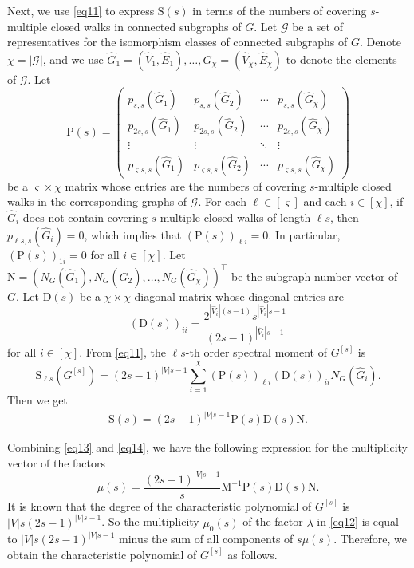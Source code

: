 \documentclass{article}
\begin{document}
Next, 
we use \eqref{eq11} to express $\mathrm{S}(s)$ in terms of the numbers of covering $s$-multiple closed walks in connected subgraphs of $G$.
Let $\mathcal{G}$ be a set of representatives for the isomorphism classes of connected subgraphs of $G$.
Denote $\chi=|\mathcal{G}|$,
and we use $\widehat{G}_{1}=(\widehat{V}_{1},\widehat{E}_{1}), \ldots , \widehat{G}_{\chi}=(\widehat{V}_{\chi},\widehat{E}_{\chi})$ to denote the elements of $\mathcal{G}$.
Let $$\mathrm{P}(s)=\begin{pmatrix} p_{s,s}(\widehat{G}_{1}) & p_{s,s}(\widehat{G}_{2}) & \cdots & p_{s,s}(\widehat{G}_{\chi}) \\ p_{2s,s}(\widehat{G}_{1}) & p_{2s,s}(\widehat{G}_{2}) & \cdots & p_{2s,s}(\widehat{G}_{\chi}) \\ \vdots & \vdots & \ddots & \vdots \\ p_{\varsigma s,s}(\widehat{G}_{1}) & p_{\varsigma s,s}(\widehat{G}_{2}) & \cdots & p_{\varsigma s,s}(\widehat{G}_{\chi}) \end{pmatrix}$$
be a $\varsigma \times \chi$ matrix whose entries are the numbers of covering $s$-multiple closed walks in the corresponding graphs of $\mathcal{G}$.
For each $\ell \in [\varsigma]$ and each $i \in [\chi]$,
if $\widehat{G}_{i}$ does not contain covering $s$-multiple closed walks of length $\ell s$,
then $p_{\ell s,s}(\widehat{G}_{i})=0$,
which implies that $\left(\mathrm{P}(s)\right)_{\ell i}=0$.
In particular,
$\left(\mathrm{P}(s)\right)_{1i}=0$ for all $i \in [\chi]$.
Let $\mathrm{N}=\left(N_{G}(\widehat{G}_{1}),N_{G}(\widehat{G}_{2}),\ldots,N_{G}(\widehat{G}_{\chi})\right)^{\top}$ be the subgraph number vector of $G$.
Let $\mathrm{D}(s)$ be a $\chi \times \chi$ diagonal matrix whose diagonal entries are
$$\left(\mathrm{D}(s)\right)_{ii}=\frac{2^{|\widehat{V}_{i}|(s-1)}s^{|\widehat{V}_{i}|s-1}}{(2s-1)^{|\widehat{V}_{i}|s-1}}$$
for all $i \in [\chi]$.
From \eqref{eq11},
the $\ell s$-th order spectral moment of $G^{[s]}$ is $$\mathrm{S}_{\ell s}(G^{[s]})=(2s-1)^{|V|s-1}\sum_{i=1}^{\chi}\left(\mathrm{P}(s)\right)_{\ell i}\left(\mathrm{D}(s)\right)_{ii}N_{G}(\widehat{G}_{i}).$$
Then we get
\begin{align}\label{eq14}
\mathrm{S}(s)=(2s-1)^{|V|s-1}\mathrm{P}(s)\mathrm{D}(s)\mathrm{N}.
\end{align}

Combining \eqref{eq13} and \eqref{eq14},
we have the following expression for the multiplicity vector of the factors
$$\mu(s)=\frac{(2s-1)^{|V|s-1}}{s}\mathrm{M}^{-1}\mathrm{P}(s)\mathrm{D}(s)\mathrm{N}.$$
It is known that the degree of the characteristic polynomial of $G^{[s]}$ is $|V|s(2s-1)^{|V|s-1}$.
So the multiplicity $\mu_{0}(s)$ of the factor $\lambda$ in \eqref{eq12} is equal to $|V|s(2s-1)^{|V|s-1}$ minus the sum of all components of $s\mu(s)$.
Therefore,
we obtain the characteristic polynomial of $G^{[s]}$ as follows.
\end{document}

